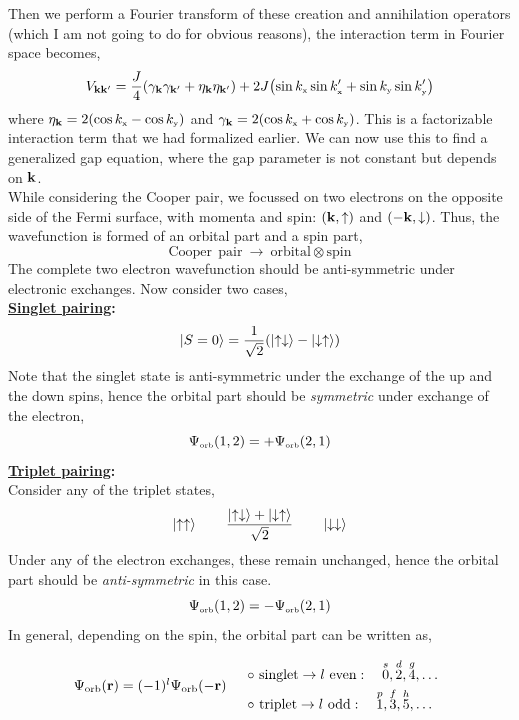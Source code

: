 \documentclass{article}
\newcommand{\tund}[1]{_{\text{\tiny #1}}}
\newcommand{\vk}{\vb{k}}
\newcommand{\vkd}{\vb{k}'}
\newcommand{\ek}{\eta_{\vk}}
\newcommand{\gk}{\gamma_{\vk}}
\begin{document}
Then we perform a Fourier transform of these creation and annihilation operators (which I am not going to do for obvious reasons), the interaction term in Fourier space becomes,
\begin{equation}
    V_{\vk\vkd} = \frac{J}{4}\qty(\gk\gamma_{\vkd} + \ek\eta_{\vkd}) + 2J\qty(\sin k\tund{x}\sin k'\tund{x}+\sin k\tund{y}\sin k'\tund{y})
\end{equation}
where $\ek = 2(\cos k\tund{x} - \cos k\tund{y})$ and $\gk = 2(\cos k\tund{x} + \cos k\tund{y})$. This is a factorizable interaction term that we had formalized earlier. We can now use this to find a generalized gap equation, where the gap parameter is not constant but depends on $\vk$.\\[0.3cm]
While considering the Cooper pair, we focussed on two electrons on the opposite side of the Fermi surface, with momenta and spin: $(\vk, \uparrow)$ and $(-\vk, \downarrow)$. Thus, the wavefunction is formed of an orbital part and a spin part, 
\begin{equation}
    \mathrm{Cooper\ \ pair}\ \rightarrow\  \mathrm{orbital}\otimes\mathrm{spin}
\end{equation}
The complete two electron wavefunction should be anti-symmetric under electronic exchanges. Now consider two cases,\\[0.2cm]
\textbf{\underline{Singlet pairing}:}\\[0.2cm]
$$\ket{S=0} = \frac{1}{\sqrt{2}}\qty(\ket{\uparrow\downarrow} - \ket{\downarrow \uparrow}) $$
Note that the singlet state is anti-symmetric under the exchange of the up and the down spins, hence the orbital part should be \textit{symmetric} under exchange of the electron,
\begin{equation}
    \Psi\tund{orb}(1,2) = + \Psi\tund{orb}(2,1)
\end{equation}
\textbf{\underline{Triplet pairing}:}\\[0.2cm]
Consider any of the triplet states,
$$\ket{\uparrow\uparrow}\qquad\frac{\ket{\uparrow\downarrow} + \ket{\downarrow\uparrow}}{\sqrt{2}}\qquad\ket{\downarrow\downarrow}$$
Under any of the electron exchanges, these remain unchanged, hence the orbital part should be \textit{anti-symmetric} in this case. 
\begin{equation}
    \Psi\tund{orb}(1,2) = - \Psi\tund{orb}(2,1)
\end{equation}
In general, depending on the spin, the orbital part can be written as, 


\begin{align}
\begin{array}{cc}
\Psi_{\rm orb}(\vb r)=(-1)^l\Psi_{\rm orb}(-\vb r)
&
\begin{array}{l}
\circ\ \text{singlet} \to l\text{ even}: \quad
\overset{s}{0},\overset{d}{2},\overset{g}{4},\ldots \\[0.3em]
\circ\ \text{triplet} \to l\text{ odd}: \quad
\overset{p}{1},\overset{f}{3},\overset{h}{5},\ldots
\end{array}
\end{array}
\end{align}
\end{document}
